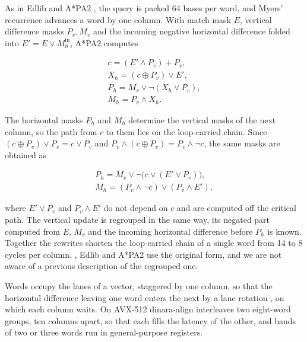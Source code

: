 As in Edlib and A*PA2 \citep{Sosic2017edlib,GrootKoerkamp2024astarpa2}, the query is packed 64 bases per word, and Myers' recurrence \citep{Myers1999bitvector} advances a word by one column. With match mask \(E\), vertical difference masks \(P_v, M_v\) and the incoming negative horizontal difference folded into \(E' = E \lor M_h^{\mathrm{in}}\), A*PA2 computes

\begin{equation}\begin{gathered}
c = (E' \land P_v) + P_v,\\ X_h = (c \oplus P_v) \lor E',\\ P_h = M_v \lor \lnot(X_h \lor P_v),\\ M_h = P_v \land X_h.
\end{gathered}\end{equation}

The horizontal masks \(P_h\) and \(M_h\) determine the vertical masks of the next column, so the path from \(c\) to them lies on the loop-carried chain. Since \((c \oplus P_v) \lor P_v = c \lor P_v\) and \(P_v \land (c \oplus P_v) = P_v \land \lnot c\), the same masks are obtained as

\begin{equation}\begin{gathered}
P_h = M_v \lor \lnot\bigl(c \lor (E' \lor P_v)\bigr),\\ M_h = (P_v \land \lnot c) \lor (P_v \land E'),
\end{gathered}\end{equation}

where \(E' \lor P_v\) and \(P_v \land E'\) do not depend on \(c\) and are computed off the critical path. The vertical update is regrouped in the same way, its negated part computed from \(E\), \(M_v\) and the incoming horizontal difference before \(P_h\) is known. Together the rewrites shorten the loop-carried chain of a single word from 14 to 8 cycles per column. \citet{Myers1999bitvector}, Edlib and A*PA2 use the original form, and we are not aware of a previous description of the regrouped one.

Words occupy the lanes of a vector, staggered by one column, so that the horizontal difference leaving one word enters the next by a lane rotation \citep{Wozniak1997,GrootKoerkamp2024astarpa2}, on which each column waits. On AVX-512 dinara-align interleaves two eight-word groups, ten columns apart, so that each fills the latency of the other, and bands of two or three words run in general-purpose registers.

